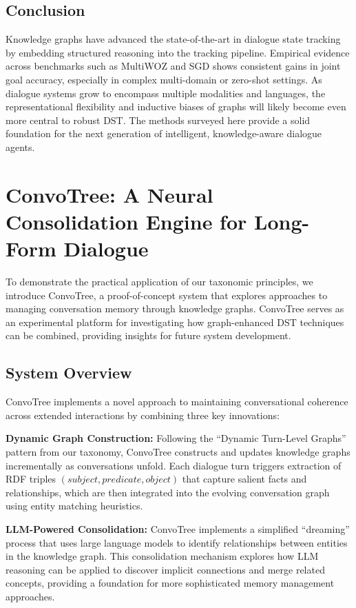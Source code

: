 \documentclass[11pt]{article}
\begin{document}
\subsection{Conclusion}
Knowledge graphs have advanced the state-of-the-art in dialogue state tracking by embedding structured reasoning into the tracking pipeline. Empirical evidence across benchmarks such as MultiWOZ and SGD shows consistent gains in joint goal accuracy, especially in complex multi-domain or zero-shot settings. As dialogue systems grow to encompass multiple modalities and languages, the representational flexibility and inductive biases of graphs will likely become even more central to robust DST. The methods surveyed here provide a solid foundation for the next generation of intelligent, knowledge-aware dialogue agents.

\section{ConvoTree: A Neural Consolidation Engine for Long-Form Dialogue}

To demonstrate the practical application of our taxonomic principles, we introduce ConvoTree, a proof-of-concept system that explores approaches to managing conversation memory through knowledge graphs. ConvoTree serves as an experimental platform for investigating how graph-enhanced DST techniques can be combined, providing insights for future system development.

\subsection{System Overview}

ConvoTree implements a novel approach to maintaining conversational coherence across extended interactions by combining three key innovations:

\textbf{Dynamic Graph Construction:} Following the ``Dynamic Turn-Level Graphs'' pattern from our taxonomy, ConvoTree constructs and updates knowledge graphs incrementally as conversations unfold. Each dialogue turn triggers extraction of RDF triples $(subject, predicate, object)$ that capture salient facts and relationships, which are then integrated into the evolving conversation graph using entity matching heuristics.

\textbf{LLM-Powered Consolidation:} ConvoTree implements a simplified ``dreaming'' process that uses large language models to identify relationships between entities in the knowledge graph. This consolidation mechanism explores how LLM reasoning can be applied to discover implicit connections and merge related concepts, providing a foundation for more sophisticated memory management approaches.
\end{document}
